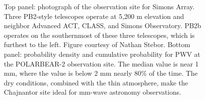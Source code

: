 \begin{figure}[!t]
    \centering
    \hfill
    \caption[Chajnantor site]{Top panel: photograph of the observation site for Simons Array. Three PB2-style telescopes operate at 5,200 m elevation and neighbor Advanced ACT, CLASS, and Simons Observatory. PB2b operates on the southernmost of these three telescopes, which is furthest to the left. Figure courtesy of Nathan Stebor. Bottom panel: probability density and cumulative probability for PWV at the POLARBEAR-2 observation site. The median value is near 1 mm, where the value is below 2 mm nearly 80\% of the time. The dry conditions, combined with the thin atmosphere, make the Chajnantor site ideal for mm-wave astronomy observations.}
    \label{fig:pwv_distribution}
\end{figure}

